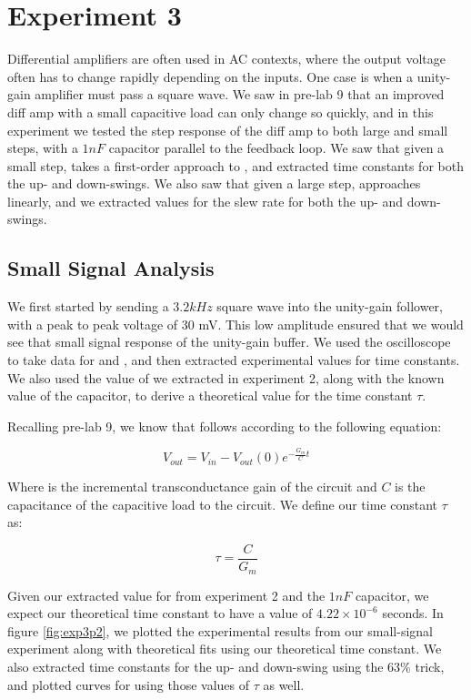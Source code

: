 \section*{Experiment 3}
Differential amplifiers are often used in AC contexts, where the output voltage often has to change rapidly depending on the inputs. One case is when a unity-gain amplifier must pass a square wave. We saw in pre-lab 9 that an improved diff amp with a small capacitive load can only change \Vout so quickly, and in this experiment we tested the step response of the diff amp to both large and small steps, with a $1 nF$ capacitor parallel to the feedback loop. We saw that given a small step, \Vout takes a first-order approach to \Vin, and extracted time constants for both the up- and down-swings. We also saw that given a large step, \Vout approaches \Vin linearly, and we extracted values for the slew rate for both the up- and down-swings.

\subsection*{Small Signal Analysis}

We first started by sending a $3.2 kHz$ square wave into the unity-gain follower, with a peak to peak voltage of 30 mV. This low amplitude ensured that we would see that small signal response of the unity-gain buffer. We used the oscilloscope to take data for \Vin and \Vout, and then extracted experimental values for time constants. We also used the value of \Gm we extracted in experiment 2, along with the known value of the capacitor, to derive a theoretical value for the time constant $\tau$.

Recalling pre-lab 9, we know that \Vout follows \Vin according to the following equation:

\begin{equation}
V_{out} = V_{in} - V_{out}(0)e^{-\frac{G_m}{C}t}
\end{equation}

Where \Gm is the incremental transconductance gain of the circuit and $C$ is the capacitance of the capacitive load to the circuit. We define our time constant $\tau$ as:

\begin{equation}
\tau = \frac{C}{G_m}
\end{equation}	

Given our extracted value for \Gm from experiment 2 and the $1 nF$ capacitor, we expect our theoretical time constant to have a value of $4.22 \times 10^{-6}$ seconds. In figure \ref{fig:exp3p2}, we plotted the experimental results from our small-signal experiment along with theoretical fits using our theoretical time constant. We also extracted time constants for the up- and down-swing using the 63\% trick, and plotted curves for using those values of $\tau$ as well.


